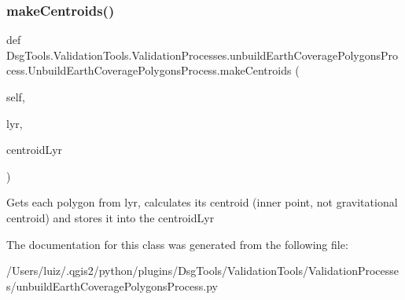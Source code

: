 \subsubsection{\texorpdfstring{make\+Centroids()}{makeCentroids()}}
{\footnotesize\ttfamily def Dsg\+Tools.\+Validation\+Tools.\+Validation\+Processes.\+unbuild\+Earth\+Coverage\+Polygons\+Process.\+Unbuild\+Earth\+Coverage\+Polygons\+Process.\+make\+Centroids (\begin{DoxyParamCaption}\item[{}]{self,  }\item[{}]{lyr,  }\item[{}]{centroid\+Lyr }\end{DoxyParamCaption})}

\begin{DoxyVerb}Gets each polygon from lyr, calculates its centroid (inner point, not gravitational centroid) and stores it into the centroidLyr
\end{DoxyVerb}
 

The documentation for this class was generated from the following file\+:\begin{DoxyCompactItemize}
\item 
/\+Users/luiz/.\+qgis2/python/plugins/\+Dsg\+Tools/\+Validation\+Tools/\+Validation\+Processes/unbuild\+Earth\+Coverage\+Polygons\+Process.\+py\end{DoxyCompactItemize}
